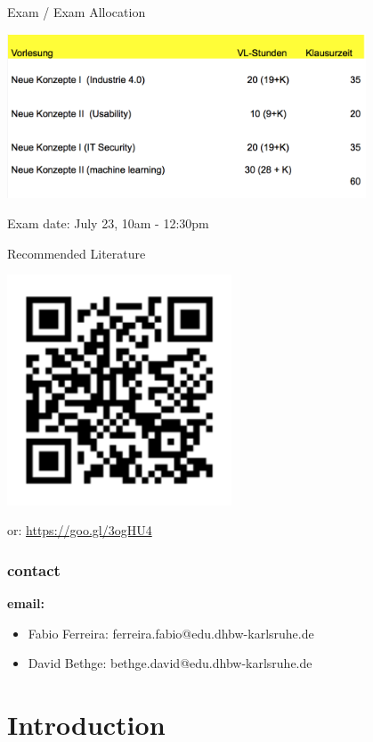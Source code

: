 \documentclass{beamer}
\begin{document}
\begin{frame}{Exam / Exam Allocation}
\begin{center}
\includegraphics[width=0.8\textwidth]{klausurplan}
\end{center}
Exam date: July 23, 10am - 12:30pm
\end{frame}



\begin{frame}{Recommended Literature}
\begin{center}
\includegraphics[width=0.5\textwidth]{qr_code_reading}
\end{center}
or: \url{https://goo.gl/3ogHU4}
\end{frame}

\begin{frame}
\frametitle{contact}
\textbf{email:}
\begin{itemize}
\item Fabio Ferreira: ferreira.fabio@edu.dhbw-karlsruhe.de
\item David Bethge: bethge.david@edu.dhbw-karlsruhe.de
\end{itemize}

\end{frame}





\section{Introduction}
\end{document}

